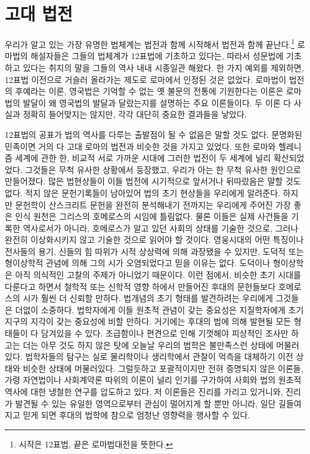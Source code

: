 
\chapter{고대 법전}

우리가 알고 있는 가장 유명한 법체계는 법전과 함께 시작해서
법전과 함께 끝난다.\footnote{시작은 12표법, 끝은 로마법대전을 뜻한다.}
로마법의 해설자들은 그들의 법체계가 12표법에 기초하고 있다는,
따라서 성문법에 기초하고 있다는 취지의 말을 그들의 역사 내내 시종일관 해왔다.
한 가지 예외를 제외하면, %
12표법 이전으로 거슬러 올라가는 제도로 로마에서 인정된 것은 없었다.
로마법이 법전의 후예라는 이론, 영국법은 기억할 수 없는
옛 불문의 전통에 기원한다는 이론은
로마법의 발달이 왜 영국법의 발달과 달랐는지를 설명하는 주요 이론들이다.
두 이론 다 사실과 정확히 들어맞지는 않지만, 각각 대단히 중요한 결과들을 낳았다.

12표법의 공표가 법의 역사를 다루는 출발점이 될 수 없음은 말할 것도 없다.
문명화된 민족이면 거의 다 고대 로마의 법전과 비슷한 것을 가지고 있었다.
또한 로마와 헬레니즘 세계에 관한 한, 비교적 서로 가까운 시대에
그러한 법전이 두 세계에 널리 확산되었었다.
그것들은 무척 유사한 상황에서 등장했고, 우리가 아는 한
무척 유사한 원인으로 만들어졌다.
많은 법현상들이 이들 법전에 시기적으로 앞서거나 뒤따랐음은 말할 것도 없다.
적지 않은 문헌기록들이 남아있어 법의 초기 현상들을 우리에게 알려준다.
하지만 문헌학이 산스크리트 문헌을 완전히 분석해내기 전까지는
우리에게 주어진 가장 좋은 인식 원천은 그리스의 호메로스의 시임에 틀림없다.
물론 이들은 실제 사건들을 기록한 역사로서가 아니라,
호메로스가 알고 있던 사회의 상태를 기술한 것으로,
그러나 완전히 이상화시키지 않고 기술한 것으로 읽어야 할 것이다.
영웅시대의 어떤 특징이나 전사들의 용기, 신들의 힘 따위가
시적 상상력에 의해 과장됐을 수 있지만, 도덕적 또는 형이상학적 관념에 의해
그의 시가 오염되었다고 믿을 이유는 없다.
도덕이나 형이상학은 아직 의식적인 고찰의 주제가 아니었기 때문이다.
이런 점에서, 비슷한 초기 시대를 다룬다고 하면서
철학적 또는 신학적 영향 하에서 만들어진 후대의 문헌들보다
호메로스의 시가 훨씬 더 신뢰할 만하다.
법개념의 초기 형태를 발견하려는 우리에게 그것들은 더없이 소중하다.
법학자에게 이들 원초적 관념이 갖는 중요성은
지질학자에게 초기 지구의 지각이 갖는 중요성에 비할 만하다.
거기에는 후대의 법에 의해 발현될 모든 형태들이 다 담겨있을 수 있다.
조급함이나 편견으로 인해 기껏해야 피상적인 조사만 하고는 더는
아무 것도 하지 않은 탓에 오늘날 우리의 법학은 불만족스런 상태에 머물러있다.
법학자들의 탐구는 실로 물리학이나 생리학에서 관찰이 억측을 대체하기 이전
상태와 비슷한 상태에 머물러있다.
그럴듯하고 포괄적이지만 전혀 증명되지 않은 이론들, 가령
자연법이나 사회계약론 따위의 이론이 널리 인기를 구가하여
사회와 법의 원초적 역사에 대한 냉철한 연구를 압도하고 있다.
저 이론들은 진리를 가리고 있거니와,
진리가 발견될 수 있는 유일한 영역으로부터 관심이 멀어지게 할 뿐만 아니라,
일단 길들여지고 믿게 되면 후대의 법학에 참으로 엄청난 영향력을
행사할 수 있다.

